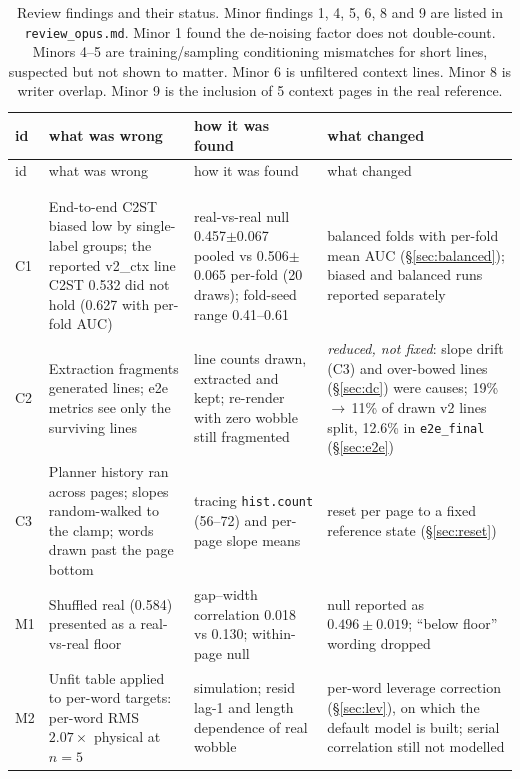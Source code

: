 \documentclass[11pt,a4paper]{article}
\begin{document}
{\small
\setlength{\LTcapwidth}{\linewidth}
\begin{longtable}{>{\raggedright\arraybackslash}p{1.1cm}>{\raggedright\arraybackslash}p{5.0cm}>{\raggedright\arraybackslash}p{3.4cm}>{\raggedright\arraybackslash}p{5.0cm}}
\toprule
id & what was wrong & how it was found & what changed\\
\midrule
\endfirsthead
\toprule
id & what was wrong & how it was found & what changed\\
\midrule
\endhead
\midrule
\multicolumn{4}{r}{\footnotesize continued on the next page}\\
\endfoot
\bottomrule
\caption{Review findings and their status. Minor findings 1, 4, 5, 6, 8 and 9
are listed in \texttt{review\_opus.md}. Minor 1 found the de-noising factor
does not double-count. Minors 4--5 are training/sampling conditioning
mismatches for short lines, suspected but not shown to matter. Minor 6 is
unfiltered context lines. Minor 8 is writer overlap. Minor 9 is the inclusion
of 5 context pages in the real reference.}\\
\endlastfoot
C1 & End-to-end C2ST biased low by single-label groups; the reported v2\_ctx line C2ST 0.532 did not hold (0.627 with per-fold AUC) & real-vs-real null 0.457$\pm$0.067 pooled vs 0.506$\pm$0.065 per-fold (20 draws); fold-seed range 0.41--0.61 & balanced folds with per-fold mean AUC (\S\ref{sec:balanced}); biased and balanced runs reported separately\\
C2 & Extraction fragments generated lines; e2e metrics see only the surviving lines & line counts drawn, extracted and kept; re-render with zero wobble still fragmented & \emph{reduced, not fixed}: slope drift (C3) and over-bowed lines (\S\ref{sec:dc}) were causes; 19\%\,$\to$\,11\% of drawn v2 lines split, 12.6\% in \texttt{e2e\_final} (\S\ref{sec:e2e})\\
C3 & Planner history ran across pages; slopes random-walked to the clamp; words drawn past the page bottom & tracing \texttt{hist.count} (56--72) and per-page slope means & reset per page to a fixed reference state (\S\ref{sec:reset})\\
M1 & Shuffled real (0.584) presented as a real-vs-real floor & gap--width correlation 0.018 vs 0.130; within-page null & null reported as $0.496\pm0.019$; ``below floor'' wording dropped\\
M2 & Unfit table applied to per-word targets: per-word RMS $2.07\times$ physical at $n=5$ & simulation; resid lag-1 and length dependence of real wobble & per-word leverage correction (\S\ref{sec:lev}), on which the default model is built; serial correlation still not modelled\\

\end{longtable}}
\end{document}
